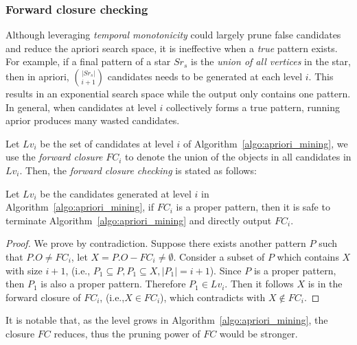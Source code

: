 \subsubsection{Forward closure checking}
Although leveraging \emph{temporal monotonicity} could largely prune false candidates and reduce
the apriori search space, it is ineffective when a \textit{true} pattern exists. 
For example, if a final pattern of a star $Sr_s$ is the \textit{union of all vertices} in the star, 
then in apriori, ${|Sr_s|}\choose{i + 1}$ candidates needs to be generated at 
each level $i$. This results in an exponential search space while
the output only contains one pattern.  
In general, when candidates at level $i$ collectively forms a true pattern, 
running aprior produces many wasted candidates. 

Let $Lv_i$ be the set of candidates at level $i$ of Algorithm~\ref{algo:apriori_mining},
we use the \emph{forward closure} $FC_i$ to denote the union of the objects in
all candidates in $Lv_i$. Then, the \emph{forward closure checking} is stated as follows:
\begin{theorem}
Let $Lv_i$ be the candidates generated at level $i$ in Algorithm~\ref{algo:apriori_mining},
if $FC_i$ is a proper pattern, then it is safe to terminate Algorithm~\ref{algo:apriori_mining}
and directly output $FC_i$.
\end{theorem}

\begin{proof}
We prove by contradiction. Suppose there exists another pattern $P$ such that $P.O \neq FC_i$, let 
$X=P.O - FC_i \neq \emptyset$. Consider a subset of $P$ which contains $X$ with size $i+1$, (i.e., $P_1 \subseteq P, P_1\subseteq X, |P_1|=i+1$). Since $P$ is a proper pattern, then $P_1$ is also a proper pattern. Therefore $P_1 \in Lv_i$.
Then it follows $X$ is in the forward closure of $FC_i$, (i.e.,$X \in FC_i$), which contradicts with $X\notin FC_i$.
\end{proof}

It is notable that, as the level grows in Algorithm~\ref{algo:apriori_mining}, the closure $FC$
reduces, thus the pruning power of $FC$ would be stronger.

%

